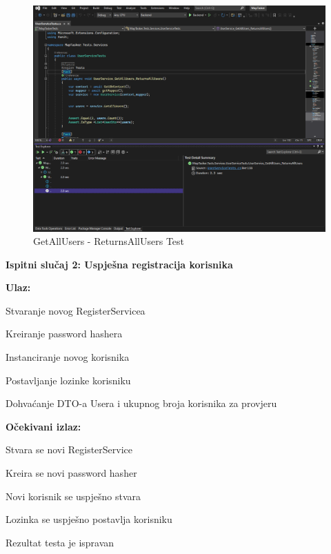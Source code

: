 			\begin{figure}[H] \includegraphics[width=\linewidth]{./slike/Testovi/Unit/UnitTest_1.png}
				\caption{GetAllUsers - ReturnsAllUsers Test}
			\end{figure}
			
			\eject
			
			\noindent \textbf{Ispitni slučaj 2: Uspješna registracija korisnika}
			
			\noindent \textbf{Ulaz:}
			
			\begin{packed_enum}
				
				\item Stvaranje novog RegisterServicea
				\item Kreiranje password hashera
				\item Instanciranje novog korisnika
				\item Postavljanje lozinke korisniku
				\item Dohvaćanje DTO-a Usera i ukupnog broja korisnika za provjeru
				
			\end{packed_enum}
			
			\noindent \textbf{Očekivani izlaz:}
			
			\begin{packed_enum}
				
				\item Stvara se novi RegisterService
				\item Kreira se novi password hasher
				\item Novi korisnik se uspješno stvara
				\item Lozinka se uspješno postavlja korisniku
				\item Rezultat testa je ispravan
				
			\end{packed_enum}
			
